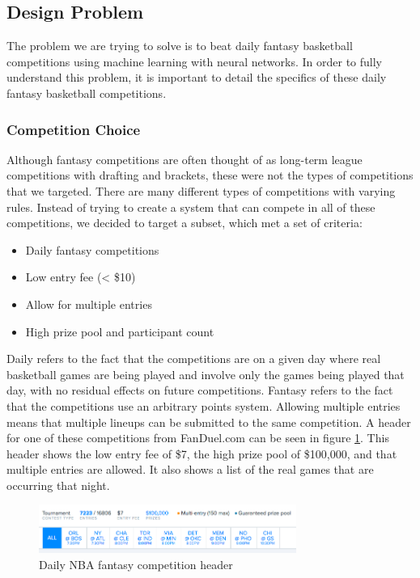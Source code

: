 \subsection{Design Problem}
The problem we are trying to solve is to beat daily fantasy basketball competitions using machine learning with neural networks. In order to fully understand this problem, it is important to detail the specifics of these daily fantasy basketball competitions. 
\subsubsection{Competition Choice}
Although fantasy competitions are often thought of as long-term league competitions with drafting and brackets, these were not the types of competitions that we targeted. There are many different types of competitions with varying rules. Instead of trying to create a system that can compete in all of these competitions, we decided to target a subset, which met a set of criteria:
\begin{itemize}
\item Daily fantasy competitions
\item Low entry fee (< \$10)
\item Allow for multiple entries
\item High prize pool and participant count
\end{itemize}
Daily refers to the fact that the competitions are on a given day where real basketball games are being played and involve only the games being played that day, with no residual effects on future competitions. Fantasy refers to the fact that the competitions use an arbitrary points system. Allowing multiple entries means that multiple lineups can be submitted to the same competition. A header for one of these competitions from FanDuel.com can be seen in figure \ref{fig:comp_header}. This header shows the low entry fee of \$7, the high prize pool of \$100,000, and that multiple entries are allowed. It also shows a list of the real games that are occurring that night.

\begin{figure}[ht]
    \centering
    \includegraphics[width=0.75\textwidth]{figures/fantasy_competition_header}
    \caption{Daily NBA fantasy competition header}
    \label{fig:comp_header}
\end{figure}

